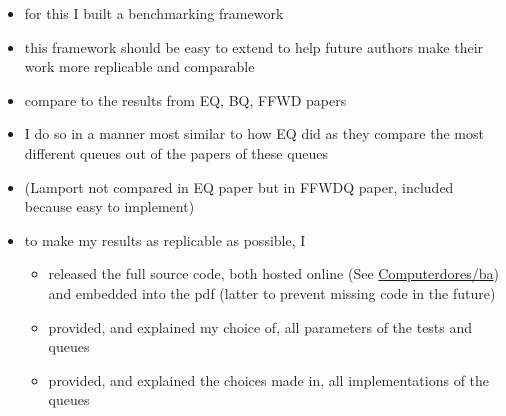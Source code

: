 \begin{itemize}
    \item for this I built a benchmarking framework
    \item this framework should be easy to extend to help future authors make their work more replicable and comparable
    \item compare to the results from EQ, BQ, FFWD papers
    \item I do so in a manner most similar to how EQ did as they compare the most different
        queues out of the papers of these queues
    \item (Lamport not compared in EQ paper but in FFWDQ paper, included because easy to implement)
    \item to make my results as replicable as possible, I
        \begin{itemize}
            \item released the full source code, both hosted online (See \href{https://github.com/Computerdores/ba}{Computerdores/ba}) and embedded into the pdf
                (latter to prevent missing code in the future)
            \item provided, and explained my choice of, all parameters of the tests and queues
            \item provided, and explained the choices made in, all implementations of the queues
        \end{itemize}
\end{itemize}
